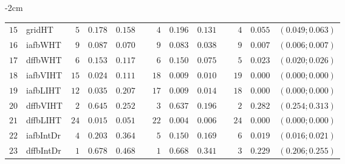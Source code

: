 \begin{table*}[!htbp]
\begin{adjustwidth*}{}{-2cm}
\begin{tabular}{@{}rlrrrrrrrrrcc@{}}
\footnotesize{$15$} & \footnotesize{gridHT   } & \footnotesize{$5 $} & \footnotesize{$0.178$} & \footnotesize{$0.158$} && \footnotesize{$4 $} & \footnotesize{$0.196$} & \footnotesize{$0.131$} && \footnotesize{$4 $} & \footnotesize{$0.055$} & \footnotesize{$(0.049;0.063)$} \\
\footnotesize{$16$} & \footnotesize{iafbWHT  } & \footnotesize{$9 $} & \footnotesize{$0.087$} & \footnotesize{$0.070$} && \footnotesize{$9 $} & \footnotesize{$0.083$} & \footnotesize{$0.038$} && \footnotesize{$9 $} & \footnotesize{$0.007$} & \footnotesize{$(0.006;0.007)$} \\
\footnotesize{$17$} & \footnotesize{dffbWHT  } & \footnotesize{$6 $} & \footnotesize{$0.153$} & \footnotesize{$0.117$} && \footnotesize{$6 $} & \footnotesize{$0.150$} & \footnotesize{$0.075$} && \footnotesize{$5 $} & \footnotesize{$0.023$} & \footnotesize{$(0.020;0.026)$} \\
\footnotesize{$18$} & \footnotesize{iafbVIHT } & \footnotesize{$15$} & \footnotesize{$0.024$} & \footnotesize{$0.111$} && \footnotesize{$18$} & \footnotesize{$0.009$} & \footnotesize{$0.010$} && \footnotesize{$19$} & \footnotesize{$0.000$} & \footnotesize{$(0.000;0.000)$} \\
\footnotesize{$19$} & \footnotesize{iafbLIHT } & \footnotesize{$12$} & \footnotesize{$0.035$} & \footnotesize{$0.207$} && \footnotesize{$17$} & \footnotesize{$0.009$} & \footnotesize{$0.014$} && \footnotesize{$18$} & \footnotesize{$0.000$} & \footnotesize{$(0.000;0.000)$} \\
\footnotesize{$20$} & \footnotesize{dffbVIHT } & \footnotesize{$2 $} & \footnotesize{$0.645$} & \footnotesize{$0.252$} && \footnotesize{$3 $} & \footnotesize{$0.637$} & \footnotesize{$0.196$} && \footnotesize{$2 $} & \footnotesize{$0.282$} & \footnotesize{$(0.254;0.313)$} \\
\footnotesize{$21$} & \footnotesize{dffbLIHT } & \footnotesize{$24$} & \footnotesize{$0.015$} & \footnotesize{$0.051$} && \footnotesize{$22$} & \footnotesize{$0.004$} & \footnotesize{$0.006$} && \footnotesize{$24$} & \footnotesize{$0.000$} & \footnotesize{$(0.000;0.000)$} \\
\footnotesize{$22$} & \footnotesize{iafbIntDr} & \footnotesize{$4 $} & \footnotesize{$0.203$} & \footnotesize{$0.364$} && \footnotesize{$5 $} & \footnotesize{$0.150$} & \footnotesize{$0.169$} && \footnotesize{$6 $} & \footnotesize{$0.019$} & \footnotesize{$(0.016;0.021)$} \\
\footnotesize{$23$} & \footnotesize{dffbIntDr} & \footnotesize{$1 $} & \footnotesize{$0.678$} & \footnotesize{$0.468$} && \footnotesize{$1 $} & \footnotesize{$0.668$} & \footnotesize{$0.341$} && \footnotesize{$3 $} & \footnotesize{$0.229$} & \footnotesize{$(0.206;0.255)$} \\

\end{tabular}
\end{adjustwidth*}
\end{table*}
